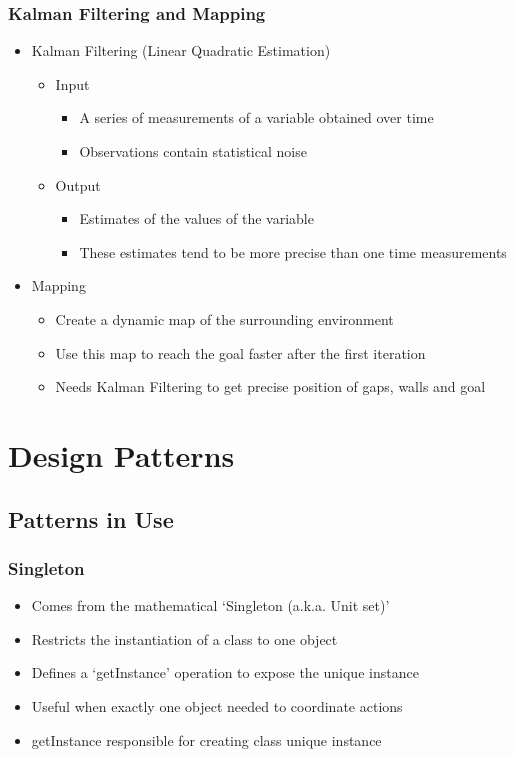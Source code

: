 \documentclass{beamer}
\begin{document}
\begin{frame}
\frametitle{Kalman Filtering and Mapping}
\begin{itemize}
\item Kalman Filtering (Linear Quadratic Estimation)
\begin{itemize}
\item Input
\begin{itemize}
\item A series of measurements of a variable obtained over time
\item Observations contain statistical noise
\end{itemize}
\item Output
\begin{itemize}
\item Estimates of the values of the variable
\item These estimates tend to be more precise than one time measurements
\end{itemize}
\end{itemize}
\item Mapping
\begin{itemize}
\item Create a dynamic map of the surrounding environment
\item Use this map to reach the goal faster after the first iteration
\item Needs Kalman Filtering to get precise position of gaps, walls and goal
\end{itemize}
\end{itemize}



\end{frame}
\section{Design Patterns}
\subsection{Patterns in Use}
\begin{frame}
\frametitle{Singleton}
\begin{itemize}
\item Comes from the mathematical `Singleton (a.k.a. Unit set)'
\item Restricts the instantiation of a class to one object
\item Defines a `getInstance' operation to expose the unique instance
\item Useful when exactly one object needed to coordinate actions
\item getInstance responsible for creating class unique instance
\end{itemize}
\end{frame}
\end{document}

